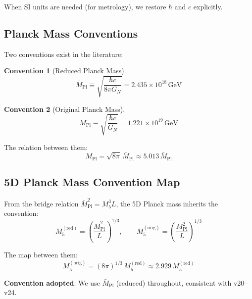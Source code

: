 \documentclass[11pt,a4paper]{article}
\newcommand{\Mpl}{\bar{M}_{\mathrm{Pl}}}
\newcommand{\MplOrig}{M_{\mathrm{Pl}}}
\newcommand{\Mfive}{M_5}
\newcommand{\GeV}{\,\mathrm{GeV}}
\theoremstyle{definition}
\newtheorem{convention}{Convention}[section]
\theoremstyle{plain}
\theoremstyle{remark}
\begin{document}
When SI units are needed (for metrology), we restore $\hbar$ and $c$ explicitly.

\subsection{Planck Mass Conventions}
\label{sec:planck-conventions}

Two conventions exist in the literature:

\begin{convention}[Reduced Planck Mass]
\label{conv:reduced-planck}
\begin{equation}
\Mpl \equiv \sqrt{\frac{\hbar c}{8\pi G_N}} = 2.435 \times 10^{18}\GeV
\label{eq:Mpl-reduced}
\end{equation}
\end{convention}

\begin{convention}[Original Planck Mass]
\label{conv:original-planck}
\begin{equation}
\MplOrig \equiv \sqrt{\frac{\hbar c}{G_N}} = 1.221 \times 10^{19}\GeV
\label{eq:Mpl-original}
\end{equation}
\end{convention}

The relation between them:
\begin{equation}
\boxed{\MplOrig = \sqrt{8\pi} \, \Mpl \approx 5.013 \, \Mpl}
\label{eq:Mpl-map}
\end{equation}

\subsection{5D Planck Mass Convention Map}

From the bridge relation $\Mpl^2 = \Mfive^3 L$, the 5D Planck mass inherits the convention:
\begin{equation}
\Mfive^{(\text{red})} = \left(\frac{\Mpl^2}{L}\right)^{1/3}, \qquad
\Mfive^{(\text{orig})} = \left(\frac{\MplOrig^2}{L}\right)^{1/3}
\label{eq:M5-conventions}
\end{equation}

The map between them:
\begin{equation}
\boxed{\Mfive^{(\text{orig})} = (8\pi)^{1/3} \, \Mfive^{(\text{red})} \approx 2.929 \, \Mfive^{(\text{red})}}
\label{eq:M5-map}
\end{equation}

\textbf{Convention adopted}: We use $\Mpl$ (reduced) throughout, consistent with v20--v24.
\end{document}
